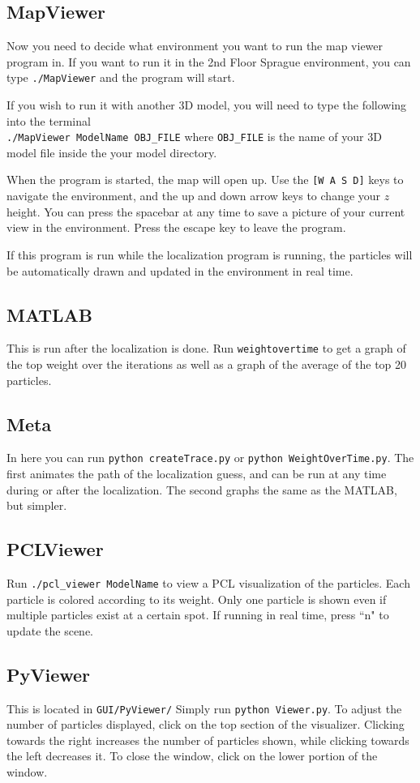 \documentclass[11pt]{article}
\begin{document}
\subsection{MapViewer}
  Now you need to decide what environment you want to run the map viewer program in. If you want to run it in the 2nd Floor Sprague environment, you can type \texttt{./MapViewer} and the program will start. 
  
  If you wish to run it with another 3D model, you will need to type the following into the terminal \\
  \verb,./MapViewer ModelName OBJ_FILE, where \verb.OBJ_FILE. is the name of your 3D model file inside the your model directory.

  When the program is started, the map will open up. Use the \texttt{[W A S D]} keys to navigate the environment, and the up and down arrow keys to change your $z$ height. You can press the spacebar at any time to save a picture of your current view in the environment. Press the escape key to leave the program.

  If this program is run while the localization program is running, the particles will be automatically drawn and updated in the environment in real time.

\subsection{MATLAB}
This is run after the localization is done. Run \verb.weightovertime. to get a graph of the top weight over the iterations as well as a graph of the average of the top 20 particles.
\subsection{Meta}
In here you can run \verb`python createTrace.py` or \verb`python WeightOverTime.py`. The first animates the path of the localization guess, and can be run at any time during or after the localization. The second graphs the same as the MATLAB, but simpler.
\subsection{PCLViewer}
Run \verb`./pcl_viewer ModelName` to view a PCL visualization of the particles. Each particle is colored according to its weight. Only one particle is shown even if multiple particles exist at a certain spot. If running in real time, press ``n" to update the scene.
\subsection{PyViewer}
This is located in \verb.GUI/PyViewer/. Simply run \verb`python Viewer.py`. To adjust the number of particles displayed, click on the top section of the visualizer. Clicking towards the right increases the number of particles shown, while clicking towards the left decreases it. To close the window, click on the lower portion of the window.
\end{document}
